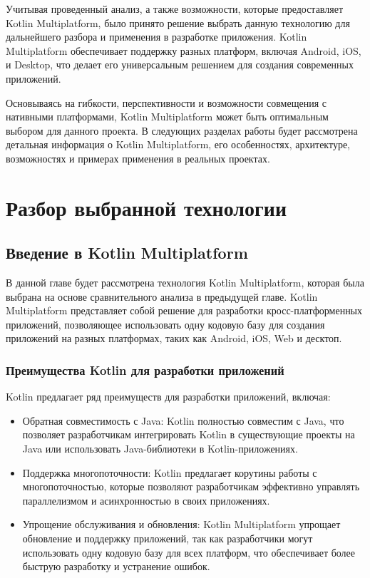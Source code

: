 \documentclass[14pt, russian]{scrartcl}
\begin{document}
Учитывая проведенный анализ, а также возможности, которые предоставляет Kotlin Multiplatform, было принято решение выбрать данную технологию для дальнейшего разбора и применения в разработке приложения. Kotlin Multiplatform обеспечивает поддержку разных платформ, включая Android, iOS, и Desktop, что делает его универсальным решением для создания современных приложений. 

Основываясь на гибкости, перспективности и возможности совмещения с нативными платформами, Kotlin Multiplatform может быть оптимальным выбором для данного проекта. В следующих разделах работы будет рассмотрена детальная информация о Kotlin Multiplatform, его особенностях, архитектуре, возможностях и примерах применения в реальных проектах.

\section{Разбор выбранной технологии}\label{Sect::kotlinmp}

\subsection{Введение в Kotlin Multiplatform}

В данной главе будет рассмотрена технология Kotlin Multiplatform, которая была выбрана на основе сравнительного анализа в предыдущей главе. Kotlin Multiplatform представляет собой решение для разработки кросс-платформенных приложений, позволяющее использовать одну кодовую базу для создания приложений на разных платформах, таких как Android, iOS, Web и десктоп.

\subsubsection{Преимущества Kotlin для разработки приложений}

Kotlin предлагает ряд преимуществ для разработки приложений, включая:
\begin{itemize}
    \item Обратная совместимость с Java: Kotlin полностью совместим с Java, что позволяет разработчикам интегрировать Kotlin в существующие проекты на Java или использовать Java-библиотеки в Kotlin-приложениях.
    \item Поддержка многопоточности: Kotlin предлагает корутины работы с многопоточностью, которые позволяют разработчикам эффективно управлять параллелизмом и асинхронностью в своих приложениях.
    \item Упрощение обслуживания и обновления: Kotlin Multiplatform упрощает обновление и поддержку приложений, так как разработчики могут использовать одну кодовую базу для всех платформ, что обеспечивает более быструю разработку и устранение ошибок.
\end{itemize}
\end{document}
